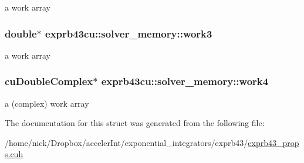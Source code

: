 a work array 

\subsubsection[{\texorpdfstring{work3}{work3}}]{\setlength{\rightskip}{0pt plus 5cm}double$\ast$ exprb43cu\+::solver\+\_\+memory\+::work3}\hypertarget{structexprb43cu_1_1solver__memory_ae3a2fe062018c4b7f97f039feceeb003}{}\label{structexprb43cu_1_1solver__memory_ae3a2fe062018c4b7f97f039feceeb003}


a work array 

\subsubsection[{\texorpdfstring{work4}{work4}}]{\setlength{\rightskip}{0pt plus 5cm}cu\+Double\+Complex$\ast$ exprb43cu\+::solver\+\_\+memory\+::work4}\hypertarget{structexprb43cu_1_1solver__memory_a7db0969d6909faa9beb4965290c52a63}{}\label{structexprb43cu_1_1solver__memory_a7db0969d6909faa9beb4965290c52a63}


a (complex) work array 



The documentation for this struct was generated from the following file\+:\begin{DoxyCompactItemize}
\item 
/home/nick/\+Dropbox/acceler\+Int/exponential\+\_\+integrators/exprb43/\hyperlink{exprb43__props_8cuh}{exprb43\+\_\+props.\+cuh}\end{DoxyCompactItemize}
